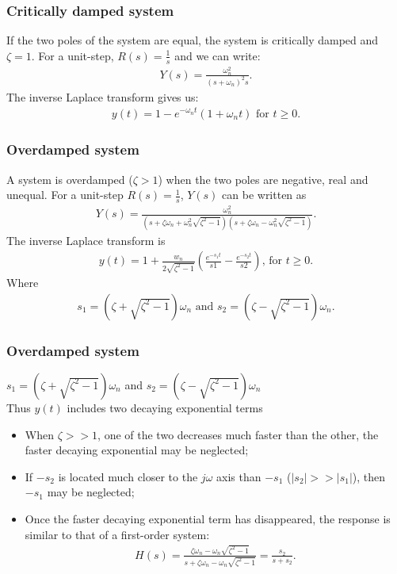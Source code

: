 \begin{frame}
\frametitle{Critically damped system}
If the two poles of the system are equal, the system is critically damped and $\zeta=1$. For a unit-step, $R(s)=\frac{1}{s}$ and we can write:
\begin{align*}
Y(s) =\frac{\omega_n ^2}{(s+\omega_n)^2 s}.
\end{align*}
The inverse Laplace transform gives us:
\begin{align*}
y(t) = 1 - e^{-\omega_n t}(1+\omega_n t) \text{ for } t\ge 0.
\end{align*}         
\end{frame}

\begin{frame}
\frametitle{Overdamped system}
A system is overdamped ($\zeta>1$) when the two poles are negative, real and unequal.
\vspace{0.25cm}
For a unit-step $R(s)=\frac{1}{s}$, $Y(s)$ can be written as
\vspace{-0.5cm}
\begin{align*}
Y(s) = \frac{\omega_n ^2}{(s+\zeta\omega_n + \omega_n ^2\sqrt{\zeta^2 -1})(s+\zeta\omega_n - \omega_n ^2\sqrt{\zeta^2 -1})}.
\end{align*} 
The inverse Laplace transform is
\vspace{-0.5cm}
\begin{align*}
y(t) = 1 +\frac{w_n}{2\sqrt{\zeta^2-1}}(\frac{e^{-s_1 t}}{s1} - \frac{e^{-s_2 t}}{s2})\text{, for } t\ge 0.
\end{align*}
Where
\vspace{-0.5cm}
\begin{align*}
s_1 = (\zeta +\sqrt{\zeta^2 -1})\omega_n\text{ and } s_2 = (\zeta -\sqrt{\zeta^2 -1})\omega_n.
\end{align*}
\end{frame}

\begin{frame}
\frametitle{Overdamped system}
$s_1 = (\zeta +\sqrt{\zeta^2 -1})\omega_n$ and $s_2 = (\zeta -\sqrt{\zeta^2 -1})\omega_n$
\\ Thus $y(t)$ includes two decaying exponential terms
\begin{itemize}
\item When $\zeta >> 1$, one of the two decreases much faster than the other, the faster decaying exponential may be neglected;
\item If $-s_2$ is located much closer to the $j\omega$ axis than $-s_1$ ($|s_2|>>|s_1|$), then $-s_1$ may be neglected;
\item Once the faster decaying exponential term has disappeared, the response is similar to that of a first-order system:
\begin{align*}
H(s) = \frac{\zeta\omega_n - \omega_n\sqrt{\zeta^2-1}}{s+\zeta\omega_n -\omega_n\sqrt{\zeta^2-1}}=\frac{s_2}{s+s_2}.
\end{align*}
\end{itemize}
\end{frame}

